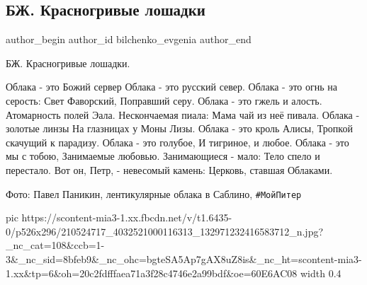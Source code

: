  
 
 
 
 
 
\subsection{БЖ. Красногривые лошадки}
\label{sec:03_07_2021.fb.bilchenko_evgenia.3.krasnogrivyje_loshadki}
\ifcmt
 author_begin
   author_id bilchenko_evgenia
 author_end
\fi

\noindent
БЖ. Красногривые лошадки.

\obeycr
Облака - это Божий сервер 
Облака - это русский север.
Облака - это огнь на серость:
Свет Фаворский, 
Поправший серу.
\smallskip
Облака - это гжель и алость.
Атомарность полей Эала.
Нескончаемая пиала:
Мама чай из неё пивала.
Облака - золотые линзы
На глазницах у Моны Лизы.
\smallskip
Облака - это кроль Алисы,
Тропкой скачущий к парадизу.
Облака - это голубое,
И тигриное, и любое.
\smallskip
Облака - это мы с тобою,
Занимаемые любовью.
Занимающиеся - мало:
Тело спело и перестало.
\smallskip
Вот он, Петр, - невесомый камень:
Церковь, ставшая Облаками.
\restorecr

Фото: Павел Паникин, лентикулярные облака в Саблино, \verb|#МойПитер|

\ifcmt
  pic https://scontent-mia3-1.xx.fbcdn.net/v/t1.6435-0/p526x296/210524717_4032521000116313_132971232416583712_n.jpg?_nc_cat=108&ccb=1-3&_nc_sid=8bfeb9&_nc_ohc=bgteSA5Ap7gAX8uZ8is&_nc_ht=scontent-mia3-1.xx&tp=6&oh=20c2fdfffaea71a3f28c4746e2a99bdf&oe=60E6AC08
  width 0.4
\fi
